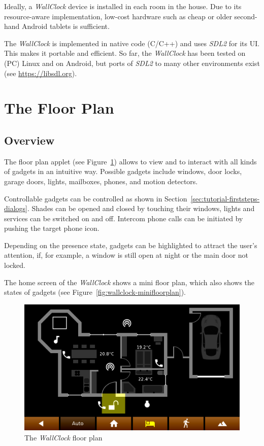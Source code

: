 \documentclass[12pt,english,parskip=half,headheight=19pt]{scrreprt}
\begin{document}
Ideally, a \textit{WallClock} device is installed in each room in the house. Due to its resource-aware implementation, low-cost hardware such as cheap or older second-hand Android tablets is sufficient.

The \textit{WallClock} is implemented in native code (C/C++) and uses \textit{SDL2} for its UI. This makes it portable and efficient. So far, the \textit{WallClock} has been tested on (PC) Linux and on Android, but ports of \textit{SDL2} to many other environments exist (see \url{https://libsdl.org}).





\section{The Floor Plan}
\label{sec:wallclock-floorplan}


\subsection{Overview}

The floor plan applet (see Figure~\ref{fig:wallclock-floorplan}) allows to view and to interact with all kinds of gadgets in an intuitive way. Possible gadgets include windows, door locks, garage doors, lights, mailboxes, phones, and motion detectors.

Controllable gadgets can be controlled as shown in Section~\ref{sec:tutorial-firststeps-dialogs}. Shades can be opened and closed by touching their windows, lights and services can be switched on and off. Intercom phone calls can be initiated by pushing the target phone icon.

Depending on the presence state, gadgets can be highlighted to attract the user's attention, if, for example, a window is still open at night or the main door not locked.

The home screen of the \textit{WallClock} shows a mini floor plan, which also shows the states of gadgets (see Figure~\ref{fig:wallclock-minifloorplan}).

\begin{figure}[ht]
  \centering
  \includegraphics[width=0.7\linewidth]{figs/wallclock-floorplan-4-night.png}
  \caption[l]{The \textit{WallClock} floor plan}
  \label{fig:wallclock-floorplan}
\end{figure}
\end{document}
